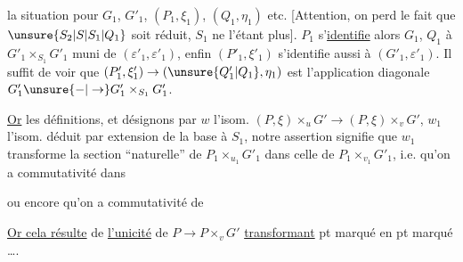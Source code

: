 la situation pour $G_1$, $G'_1$, $(P_1,\xi_1)$, $(Q_1,\eta_1)$ etc. [Attention, on perd le fait que $\unsure{S_2|S|S_1|Q_1}$ soit réduit, $S_1$ ne l'étant plus]. $P_1$ s'\uline{identifie} alors $G_1$, $Q_1$ à $G'_1\times_{S_1}G'_1$ muni de $(\varepsilon'_1,\varepsilon'_1)$,  enfin $(P'_1,\xi'_1)$ s'identifie aussi à $(G'_1,\varepsilon'_1)$. Il suffit de voir que $(P'_1,\xi'_1)\to(\unsure{Q'_1|Q_1},\eta_1)$ est l'application diagonale $G'_1\unsure{-|\to}G'_1\times_{S_1}G'_1$.

\uline{Or}  les définitions, et désignons par $w$ l'isom. $(P,\xi)\times_u G'\longrightarrow(P,\xi)\times_vG'$, $w_1$ l'isom. déduit par extension de la base à $S_1$, notre assertion signifie que $w_1$ transforme la section ``naturelle'' de $P_1\times_{u_1}G'_1$ dans celle de $P_1\times_{v_1}G'_1$, i.e. qu'on a commutativité dans


ou encore qu'on a commutativité de


\uline{Or cela résulte} de \uline{l'unicité} de $P\longrightarrow P\times_vG'$ \uline{transformant}  pt marqué en pt marqué \ldots.


